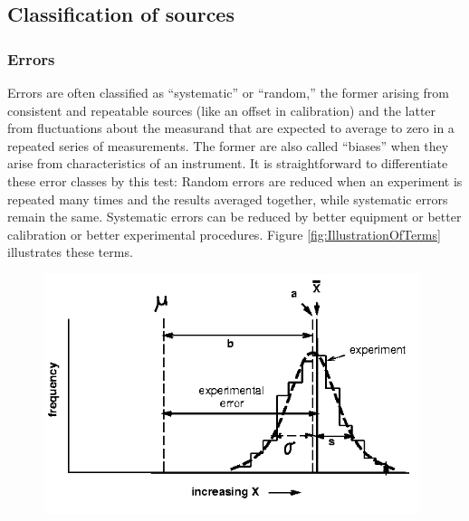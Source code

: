 \documentclass[12pt,twoside,english]{article}\usepackage[]{graphicx}\usepackage[]{color}
\let\OrgIndex\index
\renewcommand*{\index}[1]{\OrgIndex{#1}}
\begin{document}
{{\subsection{Classification of sources}
\subsubsection{Errors}

\label{sec:Classification-of-sources}Errors are often classified as ``systematic'' or ``random,'' the former arising from consistent and repeatable sources (like an offset in calibration) and the latter from fluctuations about the measurand that are expected to average to zero in a repeated series of measurements. The former are also called ``biases'' when they arise from characteristics of an instrument. It is straightforward to differentiate these error classes by this test: Random errors are reduced when an experiment is repeated many times and the results averaged together, while systematic errors remain the same. Systematic errors can be reduced by better equipment or better calibration or better experimental procedures. Figure \ref{fig:IllustrationOfTerms} illustrates these terms. 

\begin{figure}[H] 
\noindent \begin{centering}
\includegraphics[width=11cm]{SpecialGraphics/A-figure1.png}  
\par\end{centering}


\end{figure}}}
\end{document}

